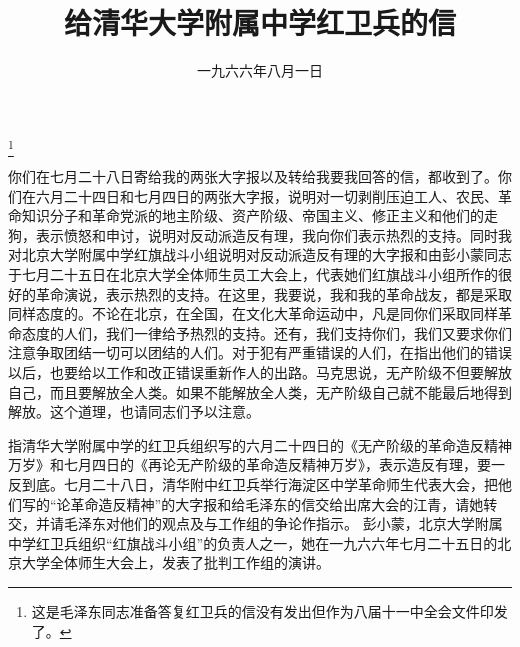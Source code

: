 
\title{给清华大学附属中学红卫兵的信}
\date{一九六六年八月一日}
\thanks{这是毛泽东同志准备答复红卫兵的信没有发出但作为八届十一中全会文件印发了。}
\maketitle



你们在七月二十八日寄给我的两张大字报以及转给我要我回答的信，都收到了。你们在六月二十四日和七月四日的两张大字报，说明对一切剥削压迫工人、农民、革命知识分子和革命党派的地主阶级、资产阶级、帝国主义、修正主义和他们的走狗，表示愤怒和申讨，说明对反动派造反有理，我向你们表示热烈的支持。同时我对北京大学附属中学红旗战斗小组说明对反动派造反有理的大字报和由彭小蒙同志于七月二十五日在北京大学全体师生员工大会上，代表她们红旗战斗小组所作的很好的革命演说，表示热烈的支持。在这里，我要说，我和我的革命战友，都是采取同样态度的。不论在北京，在全国，在文化大革命运动中，凡是同你们采取同样革命态度的人们，我们一律给予热烈的支持。还有，我们支持你们，我们又要求你们注意争取团结一切可以团结的人们。对于犯有严重错误的人们，在指出他们的错误以后，也要给以工作和改正错误重新作人的出路。马克思说，无产阶级不但要解放自己，而且要解放全人类。如果不能解放全人类，无产阶级自己就不能最后地得到解放。这个道理，也请同志们予以注意。

\begin{maonote}
指清华大学附属中学的红卫兵组织写的六月二十四日的《无产阶级的革命造反精神万岁》和七月四日的《再论无产阶级的革命造反精神万岁》，表示造反有理，要一反到底。七月二十八日，清华附中红卫兵举行海淀区中学革命师生代表大会，把他们写的“论革命造反精神”的大字报和给毛泽东的信交给出席大会的江青，请她转交，并请毛泽东对他们的观点及与工作组的争论作指示。
彭小蒙，北京大学附属中学红卫兵组织“红旗战斗小组”的负责人之一，她在一九六六年七月二十五日的北京大学全体师生大会上，发表了批判工作组的演讲。
\end{maonote}
